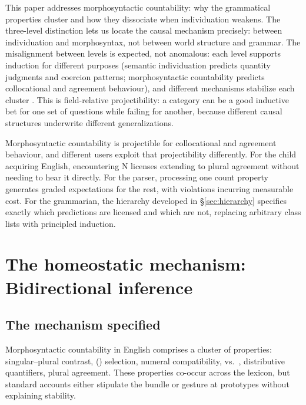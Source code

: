 \documentclass[12pt,a4paper]{article}
\begin{document}
This paper addresses morphosyntactic countability: why the grammatical properties cluster and how they dissociate when individuation weakens. The three-level distinction lets us locate the causal mechanism precisely: between individuation and morphosyntax, not between world structure and grammar. The misalignment between levels is expected, not anomalous: each level supports induction for different purposes (semantic individuation predicts quantity judgments and coercion patterns; morphosyntactic countability predicts collocational and agreement behaviour), and different mechanisms stabilize each cluster \citep{reynolds2025stack}. This is field-relative projectibility: a category can be a good inductive bet for one set of questions while failing for another, because different causal structures underwrite different generalizations.

Morphosyntactic countability is projectible for collocational and agreement behaviour, and different users exploit that projectibility differently. For the child acquiring English, encountering  N licenses extending to plural agreement without needing to hear it directly. For the parser, processing one count property generates graded expectations for the rest, with violations incurring measurable cost. For the grammarian, the hierarchy developed in \S\ref{sec:hierarchy} specifies exactly which predictions are licensed and which are not, replacing arbitrary class lists with principled induction.

\section{The homeostatic mechanism: Bidirectional inference}\label{sec:mechanism}

\subsection{The mechanism specified}\label{sec:mechanism-spec}

Morphosyntactic countability in English comprises a cluster of properties: singular--plural contrast, () selection, numeral compatibility,  vs.\ , distributive quantifiers, plural agreement. These properties co-occur across the lexicon, but standard accounts either stipulate the bundle or gesture at prototypes without explaining stability.
\end{document}
